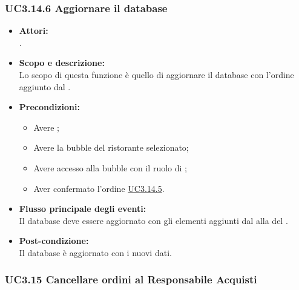 \subsubsection{UC3.14.6 Aggiornare il database} \label{UC3.14.6}

\begin{itemize}
	\item \textbf{Attori:}
	\\.
	\item \textbf{Scopo e descrizione:} 
	\\Lo scopo di questa funzione è quello di aggiornare il database con l’ordine aggiunto dal .
	\item \textbf{Precondizioni:}
	\begin{itemize}
		\item Avere ;
		\item Avere la bubble del ristorante selezionato;
		\item Avere accesso alla bubble con il ruolo di ;
		\item Aver confermato l’ordine \hyperref[UC3.14.5]{UC3.14.5}.
	\end{itemize}
	\item \textbf{Flusso principale degli eventi:}
	\\Il database deve essere aggiornato con gli elementi aggiunti dal  alla  del .
	\item \textbf{Post-condizione:}
	\\Il database è aggiornato con i nuovi dati.
\end{itemize}

\subsubsection{UC3.15 Cancellare ordini al Responsabile Acquisti} \label{UC3.15}


